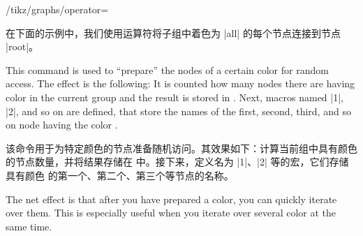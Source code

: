 \begin{key}{/tikz/graphs/operator=}
\begin{command}{\tikzgraphforeachcolorednode{}}
        在下面的示例中，我们使用运算符将子组中着色为 |all| 的每个节点连接到节点 |root|。
%
\begin{codeexample}[preamble={\usetikzlibrary{graphs}}]
\def\myconnect#1{\tikzset{graphs/new ->={root}{#1}{}{}}}

\end{codeexample}
    \end{command}

    \begin{command}{\tikzgraphpreparecolor{}}
        This command is used to ``prepare'' the nodes of a certain color for
        random access. The effect is the following: It is counted how many
        nodes there are having color  in the current group and
        the result is stored in . Next, macros named
        |1|, |2|, and so on are defined, that store
        the names of the first, second, third, and so on node having the color
        .

        该命令用于为特定颜色的节点准备随机访问。其效果如下：计算当前组中具有颜色  的节点数量，并将结果存储在  中。接下来，定义名为 |1|、|2| 等的宏，它们存储具有颜色  的第一个、第二个、第三个等节点的名称。

        The net effect is that after you have prepared a color, you can quickly
        iterate over them. This is especially useful when you iterate over
        several color at the same time.


\end{command}
\end{key}
